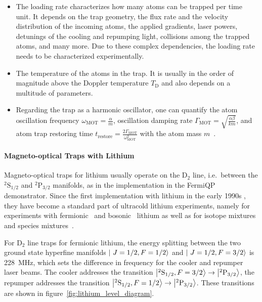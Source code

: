 \begin{itemize}
    \item The loading rate characterizes how many atoms can be trapped per time unit. It depends on the trap geometry, the flux rate and the velocity distribution of the incoming atoms, the applied gradients, laser powers, detunings of the cooling and repumping light, collisions among the trapped atoms, and many more. Due to these complex dependencies, the loading rate needs to be characterized experimentally.
    \item The temperature of the atoms in the trap. It is usually in the order of magnitude above the Doppler temperature $T_\text{D}$ and also depends on a multitude of parameters.
    \item Regarding the trap as a harmonic oscillator, one can quantify the atom oscillation frequency $\omega_\text{MOT} = \frac{\alpha}{m}$, oscillation damping rate $\Gamma_\text{MOT} = \sqrt{\frac{\alpha \beta}{km}}$, and atom trap restoring time $t_\text{restore} = \frac{2\Gamma_\text{MOT}}{\omega_\text{MOT}^2}$ with the atom mass $m$~\cite{metcalf_laser_1999}.
\end{itemize}


\paragraph{Magneto-optical Traps with Lithium}\label{ch:3d_mots_with_li}
Magneto-optical traps for lithium usually operate on the D$_2$ line, i.e.~between the $^2\text{S}_{1/2}$ and $^2\text{P}_{3/2}$ manifolds, as in the implementation in the FermiQP demonstrator. Since the first implementation with lithium in the early 1990s \cite{kawanaka_decay_1993}, they have become a standard part of ultracold lithium experiments, namely for experiments with fermionic~\cite{duarte_all-optical_2011,omran_microscopic_2015} and bosonic~\cite{kawanaka_decay_1993,schunemann_magneto-optic_1998} lithium as well as for isotope mixtures \cite{mewes_simultaneous_1999, schreck_sympathetic_2001, hilker_laser_2012, kerkmann_novel_2019} and species mixtures~\cite{ladouceur_compact_2009,tiecke_high-flux_2009,chen_lithium-cesium_2021}.

For D$_2$ line traps for fermionic lithium, the energy splitting between the two ground state hyperfine manifolds $\Ket{~J=1/2, F=1/2}$ and $\Ket{~J=1/2, F=3/2}$ is \SI{228}{\mega\hertz}, which sets the difference in frequency for the cooler and repumper laser beams. The cooler addresses the transition $\Ket{^2\text{S}_{1/2}, F = 3/2} \rightarrow \Ket{^2\text{P}_{3/2}}$, the repumper addresses the transition $\Ket{^2\text{S}_{1/2}, F = 1/2} \rightarrow \Ket{^2\text{P}_{3/2}}$. These transitions are shown in figure~\ref{fig:lithium_level_diagram}.

